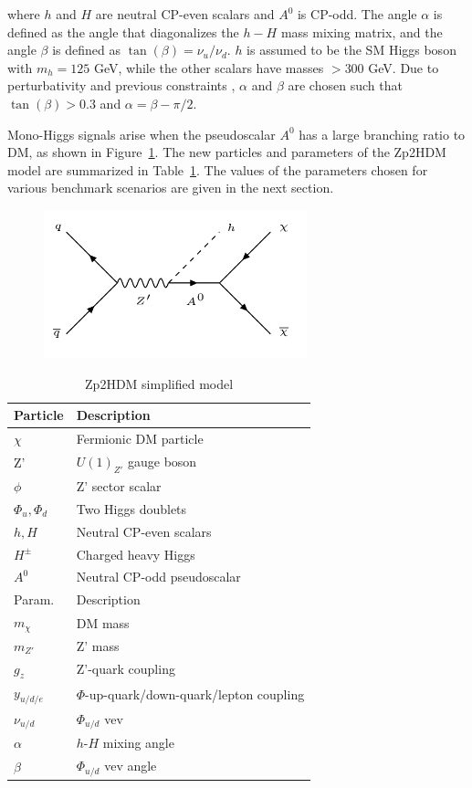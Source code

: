 where $h$ and $H$ are neutral CP-even scalars and $A^0$ is CP-odd. The angle $\alpha$ is defined as the angle that diagonalizes the $h-H$ mass mixing matrix, and the angle $\beta$ is defined as $\tan(\beta) = \nu_u / \nu_d$. $h$ is assumed to be the SM Higgs boson with $m_h = 125$ GeV, while the other scalars have masses $> 300$ GeV. Due to perturbativity and previous constraints \cite{Craig:2013hca}, $\alpha$ and $\beta$ are chosen such that $\tan(\beta)>0.3$ and $\alpha = \beta - \pi/2$.

Mono-Higgs signals arise when the pseudoscalar $A^0$ has a large branching ratio to DM, as shown in Figure~\ref{fig:zp2hdmsig}. The new particles and parameters of the Zp2HDM model are summarized in Table~\ref{tab:Zp2HDM}. The values of the parameters chosen for various benchmark scenarios are given in the next section.

\begin{figure}[tbh]
\centering
\includegraphics[width=3in]{figures/zp2hdmsig.png}
\caption{}
\label{fig:zp2hdmsig}
\end{figure}

\begin{table}[htbH]
\begin{center}
\begin{tabular}{ l | l}
\hline
Particle & Description \\
\hline
$\chi$ & Fermionic DM particle \\
Z' & $U(1)_{Z'}$ gauge boson \\
$\phi$ & Z' sector scalar \\
$\Phi_u, \Phi_d$ & Two Higgs doublets \\
$h, H$ & Neutral CP-even scalars \\
$H^\pm$ & Charged heavy Higgs \\
$A^0$ & Neutral CP-odd pseudoscalar \\
\hline
Param. & Description \\
\hline
$m_\chi$ & DM mass \\
$m_{Z'}$ & Z' mass \\
$g_z$ & Z'-quark coupling \\
$y_{u/d/e}$ & $\Phi$-up-quark/down-quark/lepton coupling \\
$\nu_{u/d}$ & $\Phi_{u/d}$ vev \\
$\alpha$ & $h$-$H$ mixing angle \\
$\beta$ & $\Phi_{u/d}$ vev angle \\
\hline
\end{tabular}
\caption{Zp2HDM simplified model}\label{tab:Zp2HDM}
\end{center}
\end{table}


